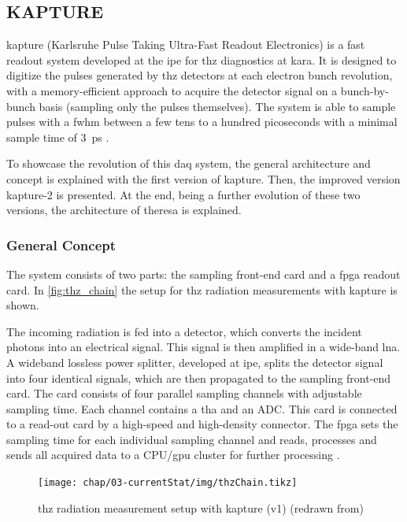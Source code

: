 \subsection{KAPTURE}
\Gls{kapture} (Karlsruhe Pulse Taking Ultra-Fast Readout Electronics) is a fast readout system developed at the \Gls{ipe} for \Gls{thz} diagnostics at \gls{kara}. 
It is designed to digitize the pulses generated by \Gls{thz} detectors at each electron bunch revolution, with a memory-efficient approach to acquire the detector signal on a bunch-by-bunch basis (sampling only the pulses themselves). 
The system is able to sample pulses with a \gls{fwhm} between a few tens to a hundred picoseconds with a minimal sample time of \SI{3}{\pico \second} \cite{caselleKAP}.

To showcase the revolution of this \gls{daq} system, the general architecture and concept is explained with the first version of \gls{kapture}.
Then, the improved version \gls{kapture}-2 is presented.
At the end, being a further evolution of these two versions, the architecture of \gls{theresa} is explained.

\subsubsection*{General Concept}
The system consists of two parts: the sampling front-end card and a \gls{fpga} readout card. In \autoref{fig:thz_chain} the setup for \gls{thz} radiation measurements with \gls{kapture} is shown. 

The incoming radiation is fed into a detector, which converts the incident photons into an electrical signal. 
This signal is then amplified in a wide-band \gls{lna}. 
A wideband lossless power splitter, developed at \gls{ipe}, splits the detector signal into four identical signals, which are then propagated to the sampling front-end card. 
The card consists of four parallel sampling channels with adjustable sampling time. 
Each channel contains a \gls{tha} and an ADC. 
This card is connected to a read-out card by a high-speed and high-density connector. 
The \gls{fpga} sets the sampling time for each individual sampling channel and reads, processes and sends all acquired data to a CPU/\gls{gpu} cluster for further processing \cite{caselle2014}.

\begin{figure}[tbh]
	\centering
	\texttt{[image: chap/03-currentStat/img/thzChain.tikz]}
	\caption[THz measurement with KAPTURE]{\gls{thz} radiation measurement setup with \gls{kapture} (v1) (redrawn from\cite{caselle2014})}
	\label{fig:thz_chain}
\end{figure}

